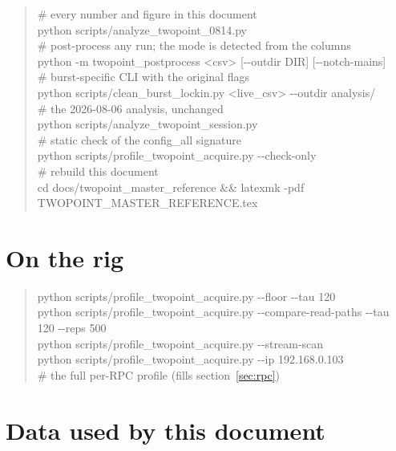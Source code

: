 \begin{quote}\small\ttfamily
\# every number and figure in this document\\
python scripts/analyze\_twopoint\_0814.py\\[4pt]
\# post-process any run; the mode is detected from the columns\\
python -m twopoint\_postprocess <csv> [-{}-outdir DIR] [-{}-notch-mains]\\[4pt]
\# burst-specific CLI with the original flags\\
python scripts/clean\_burst\_lockin.py <live\_csv> -{}-outdir analysis/\\[4pt]
\# the 2026-08-06 analysis, unchanged\\
python scripts/analyze\_twopoint\_session.py\\[4pt]
\# static check of the config\_all signature\\
python scripts/profile\_twopoint\_acquire.py -{}-check-only\\[4pt]
\# rebuild this document\\
cd docs/twopoint\_master\_reference \&\& latexmk -pdf TWOPOINT\_MASTER\_REFERENCE.tex
\end{quote}

\section{On the rig}

\begin{quote}\small\ttfamily
python scripts/profile\_twopoint\_acquire.py -{}-floor -{}-tau 120\\
python scripts/profile\_twopoint\_acquire.py -{}-compare-read-paths -{}-tau 120 -{}-reps 500\\
python scripts/profile\_twopoint\_acquire.py -{}-stream-scan\\
python scripts/profile\_twopoint\_acquire.py -{}-ip 192.168.0.103\\
\hspace*{2em}\# the full per-RPC profile (fills section~\ref{sec:rpc})
\end{quote}

\section{Data used by this document}

